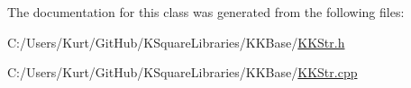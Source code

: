 The documentation for this class was generated from the following files\+:\begin{DoxyCompactItemize}
\item 
C\+:/\+Users/\+Kurt/\+Git\+Hub/\+K\+Square\+Libraries/\+K\+K\+Base/\hyperlink{_k_k_str_8h}{K\+K\+Str.\+h}\item 
C\+:/\+Users/\+Kurt/\+Git\+Hub/\+K\+Square\+Libraries/\+K\+K\+Base/\hyperlink{_k_k_str_8cpp}{K\+K\+Str.\+cpp}\end{DoxyCompactItemize}
